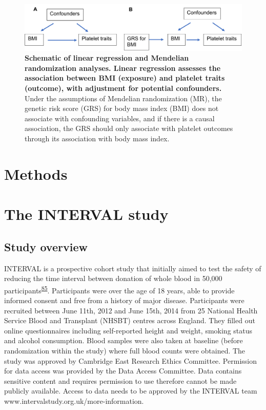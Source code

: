 \documentclass[11pt,twoside]{bristolthesis}
\begin{document}
\begin{figure}
\includegraphics[width=0.8\linewidth]{figure/BMI_platelets/obsvMRexample} \caption[Schematic of linear regression and Mendelian randomization frameworks for BMI and platelet trait analyses]{\textbf{Schematic of linear regression and Mendelian randomization analyses. Linear regression assesses the association between BMI (exposure) and platelet traits (outcome), with adjustment for potential confounders.} Under the assumptions of Mendelian randomization (MR), the genetic risk score (GRS) for body mass index (BMI) does not associate with confounding variables, and if there is a causal association, the GRS should only associate with platelet outcomes through its association with body mass index.}\label{fig:Linear-reg-MR}
\end{figure}
\hypertarget{methods}{%
\section{Methods}\label{methods}}

\hypertarget{INTERVAL-study}{%
\section{The INTERVAL study}\label{INTERVAL-study}}

\hypertarget{study-overview}{%
\subsection{Study overview}\label{study-overview}}

INTERVAL is a prospective cohort study that initially aimed to test the safety of reducing the time interval between donation of whole blood in 50,000 participants\textsuperscript{\protect\hyperlink{ref-DiAngelantonio2017}{85}}. Participants were over the age of 18 years, able to provide informed consent and free from a history of major disease. Participants were recruited between June 11th, 2012 and June 15th, 2014 from 25 National Health Service Blood and Transplant (NHSBT) centres across England. They filled out online questionnaires including self-reported height and weight, smoking status and alcohol consumption. Blood samples were also taken at baseline (before randomization within the study) where full blood counts were obtained. The study was approved by Cambridge East Research Ethics Committee. Permission for data access was provided by the Data Access Committee. Data contains sensitive content and requires permission to use therefore cannot be made publicly available. Access to data needs to be approved by the INTERVAL team www.intervalstudy.org.uk/more-information.
\end{document}

